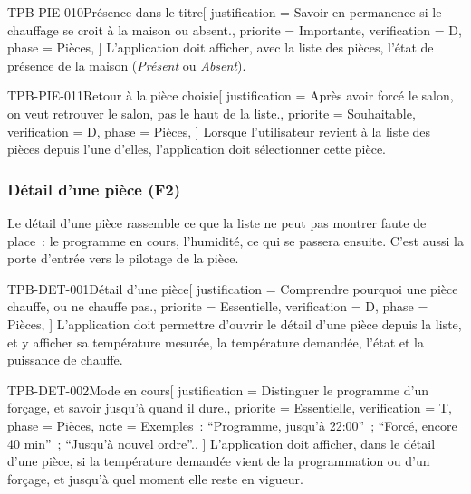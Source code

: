 \begin{exigence}{TPB-PIE-010}{Présence dans le titre}[
    justification = {Savoir en permanence si le chauffage se croit à la maison ou
                     absent.},
    priorite      = {Importante},
    verification  = {D},
    phase         = {Pièces},
  ]
  L'application doit afficher, avec la liste des pièces, l'état de présence de la maison
  (\emph{Présent} ou \emph{Absent}).
\end{exigence}

\begin{exigence}{TPB-PIE-011}{Retour à la pièce choisie}[
    justification = {Après avoir forcé le salon, on veut retrouver le salon, pas le haut de
                     la liste.},
    priorite      = {Souhaitable},
    verification  = {D},
    phase         = {Pièces},
  ]
  Lorsque l'utilisateur revient à la liste des pièces depuis l'une d'elles, l'application
  doit sélectionner cette pièce.
\end{exigence}

\subsubsection{Détail d'une pièce (F2)}

Le détail d'une pièce rassemble ce que la liste ne peut pas montrer faute de place~: le
programme en cours, l'humidité, ce qui se passera ensuite. C'est aussi la porte d'entrée
vers le pilotage de la pièce.

\begin{exigence}{TPB-DET-001}{Détail d'une pièce}[
    justification = {Comprendre pourquoi une pièce chauffe, ou ne chauffe pas.},
    priorite      = {Essentielle},
    verification  = {D},
    phase         = {Pièces},
  ]
  L'application doit permettre d'ouvrir le détail d'une pièce depuis la liste, et y
  afficher sa température mesurée, la température demandée, l'état et la puissance de
  chauffe.
\end{exigence}

\begin{exigence}{TPB-DET-002}{Mode en cours}[
    justification = {Distinguer le programme d'un forçage, et savoir jusqu'à quand il
                     dure.},
    priorite      = {Essentielle},
    verification  = {T},
    phase         = {Pièces},
    note          = {Exemples~: \enquote{Programme, jusqu'à 22:00}~; \enquote{Forcé, encore
                     40 min}~; \enquote{Jusqu'à nouvel ordre}.},
  ]
  L'application doit afficher, dans le détail d'une pièce, si la température demandée vient
  de la programmation ou d'un forçage, et jusqu'à quel moment elle reste en vigueur.
\end{exigence}

